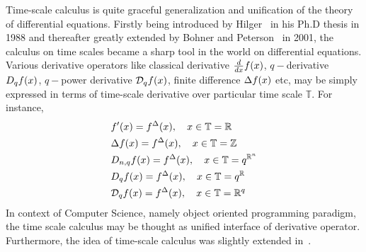Time-scale calculus is quite graceful generalization and unification of the theory of differential equations.
Firstly being introduced by Hilger~\cite{hilger1988ein} in his Ph.D thesis in 1988 and thereafter greatly
extended by Bohner and Peterson~\cite{Bohner2001DynamicEO} in 2001, the calculus on time scales became a sharp tool
in the world on differential equations.
Various derivative operators like classical derivative $\derivative{f(x)}{x}$, $q-$derivative $\qderivative{f(x)}$,
$q-$power derivative $\qpowerDerivative{f(x)}$, finite difference $\finiteDifference{f(x)}$ etc,
may be simply expressed in terms of time-scale derivative over particular time scale $\mathbb{T}$.
For instance,
\begin{align*}
    &f^\prime (x) = f^{\Delta} (x), \quad x\in\mathbb{T} = \mathbb{R} \\
    &\Delta f(x) = f^{\Delta} (x), \quad x\in\mathbb{T} = \mathbb{Z} \\
    &\nqderivative{f(x)} = f^{\Delta} (x), \quad x\in\mathbb{T} = q^{\mathbb{R}^n} \\
    &\qderivative{f(x)} = f^{\Delta} (x), \quad x\in\mathbb{T} = q^\mathbb{R} \\
    &\qpowerDerivative{f(x)} = f^{\Delta} (x), \quad x\in\mathbb{T} = \mathbb{R}^q
\end{align*}
In context of Computer Science, namely object oriented programming paradigm, the time scale calculus may be thought
as unified interface of derivative operator.
Furthermore, the idea of time-scale calculus was slightly extended
in~\cite{bayour2017truly,benkhettou2016conformable,caputo2009time,martins2009calculus}.